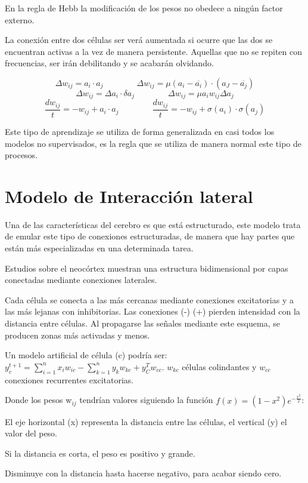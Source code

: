\documentclass[12pt, twoside, openright]{report} %
\begin{document}
En la regla de Hebb la modificación de los pesos no obedece a ningún factor externo.

La conexión entre dos células ser verá aumentada si ocurre que las dos se encuentran activas a la vez de manera persistente. Aquellas que no se repiten con frecuencias, ser irán debilitando y se acabarán olvidando.

$$\Delta w_{ij}=a_i\cdot a_j \quad\quad\quad\quad \Delta w_{ij}=\mu(a_i - \overline{a_i})\cdot(a_J- \overline{a_j})$$
$$\Delta w_{ij}=\Delta a_i\cdot \delta a_j \quad\quad\quad\quad \Delta w_{ij}= \mu a_i w_{ij} \Delta a_j$$
$$\frac{dw_{ij}}{t}=-w_{ij}+a_i\cdot a_j \quad\quad\quad\quad \frac{dw_{ij}}{t}=-w_{ij} + \sigma(a_i) \cdot \sigma(a_j)$$

Este tipo de aprendizaje se utiliza de forma generalizada en casi todos los modelos no supervisados, es la regla que se utiliza de manera normal este tipo de procesos.

\section{Modelo de Interacción lateral}
Una de las características del cerebro es que está estructurado, este modelo trata de emular este tipo de conexiones estructuradas, de manera que hay partes que están más especializadas en una determinada tarea.

Estudios sobre el neocórtex muestran una estructura bidimensional por capas conectadas mediante conexiones laterales.

Cada célula se conecta a las más cercanas mediante conexiones excitatorias y a las más lejanas con inhibitorias. Las conexiones (-) (+) pierden intensidad con la distancia entre células. Al propagarse las señales mediante este esquema, se producen zonas más activadas y menos.

Un modelo artificial de célula (c) podría ser: $y_c^{t+1}=\sum^n_{i=1} x_i w_{ic} - \sum^n_{k=1} y_k w_{kc}+y^T_C w_{cc}$. $w_{kc}$ células colindantes y $w_{cc}$ conexiones recurrentes excitatorias.

Donde los pesos w$_{ij}$ tendrían valores siguiendo la función $f(x) = (1 - x^2)e^{- \frac{x^2}{2}}$:

El eje horizontal (x) representa la distancia entre las células, el vertical (y) el valor del peso.

Si la distancia es corta, el peso es positivo y grande.

Disminuye con la distancia hasta hacerse negativo, para acabar siendo cero.
\end{document}
